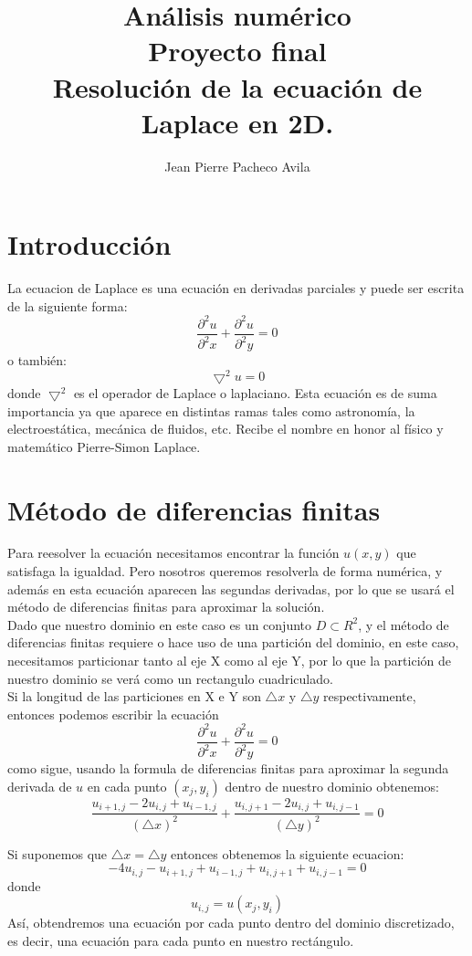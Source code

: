 \documentclass[a4paper,10pt]{article}
\title{Análisis numérico \\ Proyecto final \\ Resolución de la ecuación de Laplace en 2D.}
\author{Jean Pierre Pacheco Avila}
\begin{document}
\maketitle
\section{Introducción}

La ecuacion de Laplace es una ecuación en derivadas parciales y puede ser escrita de la siguiente forma:
$$ \frac{\partial^{2}u}{\partial^{2}x} + \frac{\partial^{2}u}{\partial^{2}y} = 0 $$ o también:
$$ \bigtriangledown^{2}u = 0$$ donde $ \bigtriangledown^{2} $ es el operador de Laplace o laplaciano. Esta ecuación es de suma
importancia ya que aparece en distintas ramas tales como astronomía, la electroestática, mecánica de fluidos, etc. Recibe el nombre en
honor al físico y matemático Pierre-Simon Laplace.


\section{Método de diferencias finitas}

Para reesolver la ecuación necesitamos encontrar la función $ u(x,y) $ que satisfaga la igualdad. Pero nosotros queremos 
resolverla de forma numérica, y además en esta ecuación aparecen las segundas derivadas, por lo que se usará el método de 
diferencias finitas para aproximar la solución. \\
Dado que nuestro dominio en este caso es un conjunto $ D \subset R^{2} $, y el método de diferencias finitas
requiere o hace uso de una partición del dominio, en este caso, necesitamos particionar tanto al eje X como al eje Y, por lo que
la partición de nuestro dominio se verá como un rectangulo cuadriculado. \\

Si la longitud de las particiones en X e Y son $\bigtriangleup x$ y $\bigtriangleup y$ respectivamente, entonces podemos escribir
la ecuación $$ \frac{\partial^{2}u}{\partial^{2}x} + \frac{\partial^{2}u}{\partial^{2}y} = 0 $$ como sigue, usando la formula
de diferencias finitas para aproximar la segunda derivada de $u$ en cada punto $ (x_{j},y_{i}) $ dentro de nuestro dominio obtenemos:
$$ \frac {u_{i+1,j} - 2u_{i,j} + u_{i-1,j}}{(\bigtriangleup x)^{2}} + \frac {u_{i,j+1} - 2u_{i,j} + u_{i,j-1}}{(\bigtriangleup y)^{2}} = 0$$

Si suponemos que $ \bigtriangleup x = \bigtriangleup y$ entonces obtenemos la siguiente ecuacion:
$$ -4u_{i,j} - u_{i+1,j} + u_{i-1,j}+ u_{i,j+1}+ u_{i,j-1}  = 0$$ donde $$ u_{i,j} = u(x_{j},y_{i}) $$
Así, obtendremos una ecuación por cada punto dentro del dominio discretizado, es decir, una ecuación para cada punto en nuestro
rectángulo.
\end{document}
